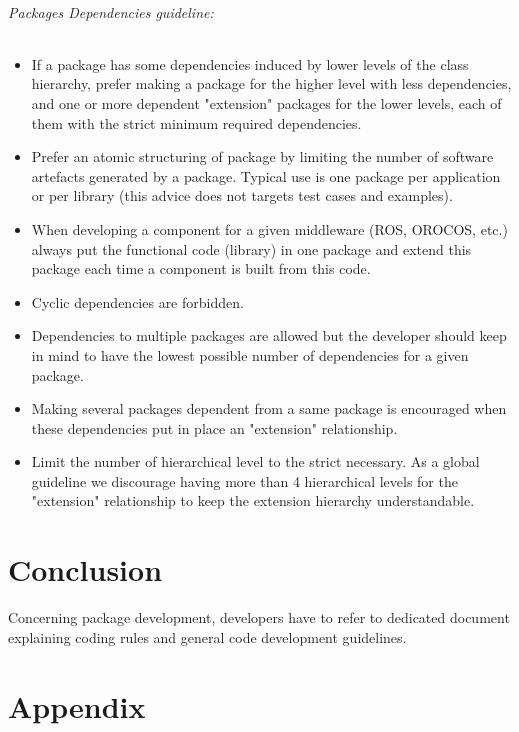 \documentclass[12pt,a4paper]{article}
\begin{document}
\paragraph{Packages Dependencies guideline:}
\begin{itemize}
\item If a package has some dependencies induced by lower levels of the class hierarchy, prefer making a package for the higher level with less dependencies, and one or more dependent "extension" packages for the lower levels, each of them with the strict minimum required dependencies.
\item Prefer an atomic structuring of package by limiting the number of software artefacts generated by a package. Typical use is one package per application or per library (this advice does not targets test cases and examples).
\item When developing a component for a given middleware (ROS, OROCOS, etc.) always put the functional code (library) in one package and extend this package each time a component is built from this code.
\item Cyclic dependencies are forbidden.
\item Dependencies to multiple packages are allowed but the developer should keep in mind to have the lowest possible number of dependencies for a given package.
\item Making several packages dependent from a same package is encouraged when these dependencies put in place an "extension" relationship.
\item Limit the number of hierarchical level to the strict necessary. As a global guideline we discourage having more than 4 hierarchical levels for the "extension" relationship to keep the extension hierarchy understandable. 
\end{itemize}

\pagebreak

\part*{Conclusion}

Concerning package development, developers have to refer to dedicated document explaining coding rules and general code development guidelines.

\pagebreak

\part*{Appendix}
\end{document}
